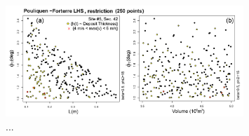 \documentclass{article}
\begin{document}
\begin{figure}[H]
\centering
\includegraphics[width=0.8\textwidth]{FigA2.png}
\caption{...}
\label{FigA2}
\end{figure}



\end{document}
